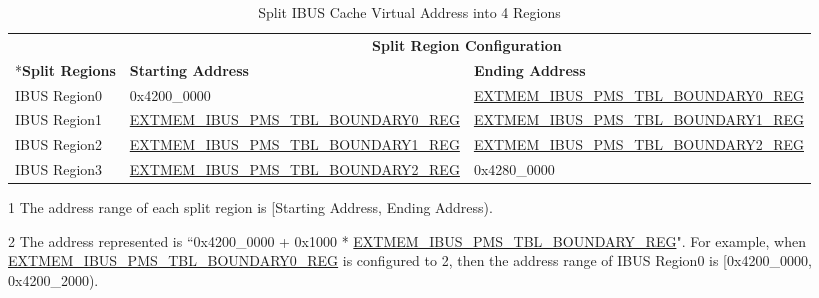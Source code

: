 \documentclass[main\_\_EN.tex]{subfiles}
\begin{document}
\begin{table}[H]
    \centering
    \caption{Split IBUS Cache Virtual Address into 4 Regions}
    \label{tab:ibus_acs_cache_region_config}
    \begin{threeparttable}
    \begin{tabular}{ | l | l | l |}
    \hline
        \rowcolor{lightgray}
         & \multicolumn{2}{c|}{\textbf{Split Region Configuration}} \\\cline{2-3}
        \rowcolor{lightgray}
        \multirow{-2}*{\textbf{Split Regions}\tnote{1}} & \textbf{Starting Address} & \textbf{Ending Address}\\\hline
        IBUS Region0  & 0x4200\_0000                                                                          & \hyperref[regdesc:EXTMEMIBUSPMSTBLBOUNDARY0REG]{EXTMEM\_IBUS\_PMS\_TBL\_BOUNDARY0\_REG}\tnote{2} \\\hline
        IBUS Region1  & \hyperref[regdesc:EXTMEMIBUSPMSTBLBOUNDARY0REG]{EXTMEM\_IBUS\_PMS\_TBL\_BOUNDARY0\_REG}\tnote{2} & \hyperref[regdesc:EXTMEMIBUSPMSTBLBOUNDARY1REG]{EXTMEM\_IBUS\_PMS\_TBL\_BOUNDARY1\_REG}\tnote{2} \\\hline
        IBUS Region2  & \hyperref[regdesc:EXTMEMIBUSPMSTBLBOUNDARY1REG]{EXTMEM\_IBUS\_PMS\_TBL\_BOUNDARY1\_REG}\tnote{2} & \hyperref[regdesc:EXTMEMIBUSPMSTBLBOUNDARY2REG]{EXTMEM\_IBUS\_PMS\_TBL\_BOUNDARY2\_REG}\tnote{2} \\\hline
        IBUS Region3  & \hyperref[regdesc:EXTMEMIBUSPMSTBLBOUNDARY2REG]{EXTMEM\_IBUS\_PMS\_TBL\_BOUNDARY2\_REG}\tnote{2} & 0x4280\_0000 \\\hline
    \end{tabular}
    \begin{tablenotes}
        \item[1] The address range of each split region is [Starting Address, Ending Address).
        \item[2] The address represented is ``0x4200\_0000 + 0x1000 * \hyperref[regdesc:EXTMEMIBUSPMSTBLBOUNDARY1REG]{EXTMEM\_IBUS\_PMS\_TBL\_BOUNDARY\_REG}". For example, when \hyperref[regdesc:EXTMEMIBUSPMSTBLBOUNDARY1REG]{EXTMEM\_IBUS\_PMS\_TBL\_BOUNDARY0\_REG} is configured to 2, then the address range of IBUS Region0 is [0x4200\_0000, 0x4200\_2000).
        \end{tablenotes}
    \end{threeparttable}
\end{table}
\end{document}
